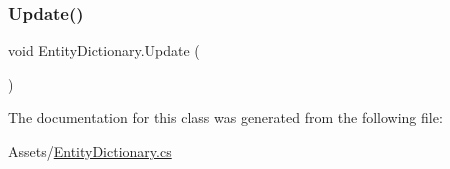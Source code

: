 \subsubsection{\texorpdfstring{Update()}{Update()}}
{\footnotesize\ttfamily void Entity\+Dictionary.\+Update (\begin{DoxyParamCaption}{ }\end{DoxyParamCaption})\hspace{0.3cm}{\ttfamily [private]}}



The documentation for this class was generated from the following file\+:\begin{DoxyCompactItemize}
\item 
Assets/\hyperlink{_entity_dictionary_8cs}{Entity\+Dictionary.\+cs}\end{DoxyCompactItemize}
